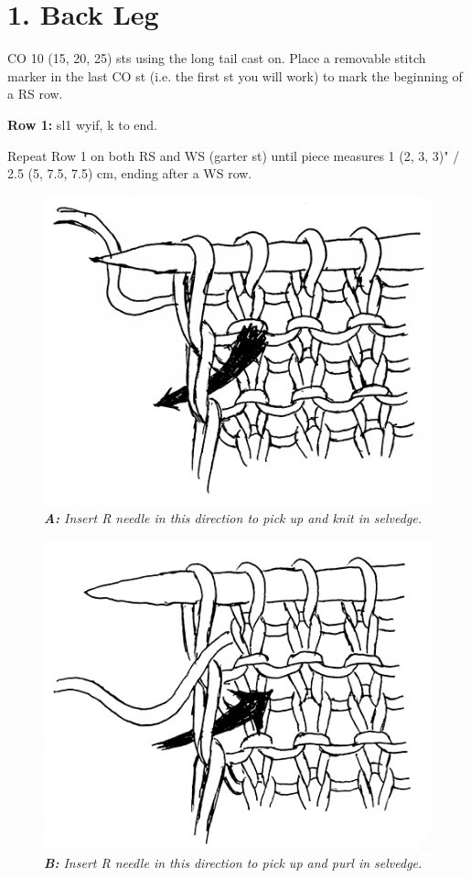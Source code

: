 \documentclass[12pt]{article}
\newcommand{\rowDir}[1]{\textbf{#1:}} %
\begin{document}
\normalsize
\newpage

\section*{1. Back Leg}

CO 10 (15, 20, 25) sts 
using the long tail cast on. Place a removable stitch marker in the last CO st (i.e. the first st you will work) to mark the beginning of a RS row.

\rowDir{Row 1} sl1 wyif, k to end.

Repeat Row 1 on both RS and WS (garter st) until piece measures 1 (2, 3, 3)" / 2.5 (5, 7.5, 7.5) cm, ending after a WS row.


\begin{figure}
\includegraphics[width=\linewidth]{punk.png}
\emph{\small \textbf{A:} Insert R needle in this direction to pick up and knit in selvedge.}

\vspace{2em}
\includegraphics[width=\linewidth]{punp.png}
\emph{\small \textbf{B:} Insert R needle in this direction to pick up and purl in selvedge.}
\vspace{-8em}
\end{figure} \leavevmode
\end{document}
